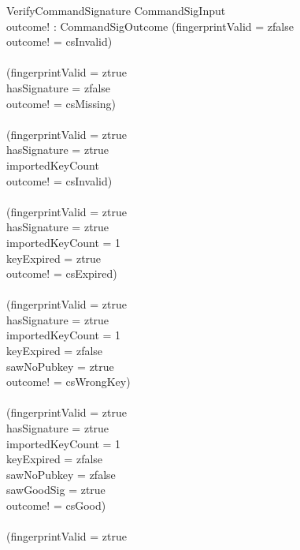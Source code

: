 \documentclass[a4paper,10pt,fleqn]{article}
\begin{document}
\begin{schema}{VerifyCommandSignature}
  CommandSigInput \\
  outcome! : CommandSigOutcome
  \where
  (fingerprintValid = zfalse \\
  \quad \implies outcome! = csInvalid) \\
  \land \\
  (fingerprintValid = ztrue \\
  \quad \land hasSignature = zfalse \\
  \quad \implies outcome! = csMissing) \\
  \land \\
  (fingerprintValid = ztrue \\
  \quad \land hasSignature = ztrue \\
  \quad \land importedKeyCount  \\
  \quad \implies outcome! = csInvalid) \\
  \land \\
  (fingerprintValid = ztrue \\
  \quad \land hasSignature = ztrue \\
  \quad \land importedKeyCount = 1 \\
  \quad \land keyExpired = ztrue \\
  \quad \implies outcome! = csExpired) \\
  \land \\
  (fingerprintValid = ztrue \\
  \quad \land hasSignature = ztrue \\
  \quad \land importedKeyCount = 1 \\
  \quad \land keyExpired = zfalse \\
  \quad \land sawNoPubkey = ztrue \\
  \quad \implies outcome! = csWrongKey) \\
  \land \\
  (fingerprintValid = ztrue \\
  \quad \land hasSignature = ztrue \\
  \quad \land importedKeyCount = 1 \\
  \quad \land keyExpired = zfalse \\
  \quad \land sawNoPubkey = zfalse \\
  \quad \land sawGoodSig = ztrue \\
  \quad \implies outcome! = csGood) \\
  \land \\
  (fingerprintValid = ztrue \\

\end{schema}
\end{document}
